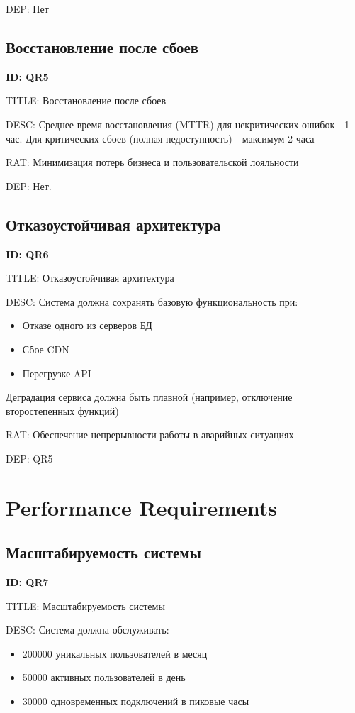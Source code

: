\documentclass{scrreprt}
\begin{document}
DEP: Нет

\subsection{Восстановление после сбоев}

\textbf{ID: QR5}

TITLE: Восстановление после сбоев

DESC:
Среднее время восстановления (MTTR) для некритических ошибок - 1 час.
Для критических сбоев (полная недоступность) - максимум 2 часа

RAT: Минимизация потерь бизнеса и пользовательской лояльности

DEP: Нет.

\subsection{Отказоустойчивая архитектура}
\textbf{ID: QR6}

TITLE: Отказоустойчивая архитектура

DESC:
Система должна сохранять базовую функциональность при:
\begin{itemize}
\item Отказе одного из серверов БД

\item Сбое CDN

\item Перегрузке API
\end{itemize}
Деградация сервиса должна быть плавной (например, отключение второстепенных функций)

RAT: Обеспечение непрерывности работы в аварийных ситуациях

DEP: QR5

\section{Performance Requirements}
\subsection{Масштабируемость системы}
\textbf{ID: QR7}

TITLE: Масштабируемость системы

DESC:
Система должна обслуживать:
\begin{itemize}
\item 200000 уникальных пользователей в месяц

\item 50000 активных пользователей в день

\item 30000 одновременных подключений в пиковые часы
\end{itemize}
\end{document}
